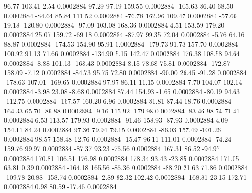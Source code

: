        96.77      103.41        2.54     0.0002884
       97.29       97.19      159.55     0.0002884
     -105.63       86.40       68.50     0.0002884
      -84.64       85.84      111.52     0.0002884
      -76.78      162.96      109.47     0.0002884
      -57.66       19.18     -120.80     0.0002884
      -97.09      103.08      168.36     0.0002884
        4.51      153.59      179.20     0.0002884
       25.07      159.72      -69.18     0.0002884
      -87.97       99.35       72.04     0.0002884
       -5.76       64.16       88.87     0.0002884
     -174.53      154.90       95.91     0.0002884
     -179.73       91.73      157.70     0.0002884
      100.92       91.13       71.66     0.0002884
     -134.90        5.15      142.47     0.0002884
      176.38      108.58       94.64     0.0002884
       -8.88      101.13     -168.43     0.0002884
        8.15       78.68       75.81     0.0002884
     -172.87      158.09       -7.12     0.0002884
      -84.73       95.75       72.80     0.0002884
      -90.00       26.45      -91.28     0.0002884
     -178.63      107.01     -169.65     0.0002884
       97.97       86.11       11.15     0.0002884
        7.70      104.07      102.14     0.0002884
       -3.98       23.08       -8.68     0.0002884
       87.44      154.93       -1.65     0.0002884
      -80.19       94.63     -112.75     0.0002884
     -167.57      160.20        6.96     0.0002884
       81.81       87.44       18.76     0.0002884
      164.33       65.70      -86.88     0.0002884
       -9.16      115.92     -179.98     0.0002884
      -83.46       98.74       71.41     0.0002884
        6.53      113.57      179.93     0.0002884
      -91.46      158.93      -87.93     0.0002884
        4.09      154.11       84.24     0.0002884
       97.36       79.94       79.15     0.0002884
      -86.03      157.49     -101.26     0.0002884
       98.57      158.48       12.76     0.0002884
      -15.47       96.11      111.01     0.0002884
      -74.24      159.76       99.97     0.0002884
      -87.37       93.23      -76.56     0.0002884
      167.31       86.52      -94.97     0.0002884
      170.81      106.51      176.98     0.0002884
      178.34       93.43      -23.85     0.0002884
      171.05       63.81        0.39     0.0002884
     -164.18      165.56      -86.36     0.0002884
      -88.20       21.63       71.86     0.0002884
     -109.78       20.88     -158.74     0.0002884
       -2.89       92.32      102.42     0.0002884
     -168.81       23.15      172.71     0.0002884
        0.98       80.59      -17.45     0.0002884
